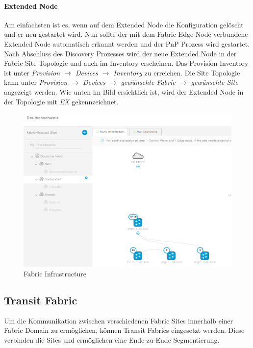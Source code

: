\paragraph{Extended Node}
Am einfachsten ist es, wenn auf dem Extended Node die Konfiguration gelöscht und er neu gestartet wird. Nun sollte der mit dem Fabric Edge Node verbundene Extended Node automatisch erkannt werden und der PnP Prozess wird gestartet. Nach Abschluss des Discovery Prozesses wird der neue Extended Node in der Fabric Site Topologie und auch im Inventory erscheinen. Das Provision Inventory ist unter \textit{Provision $\rightarrow$ Devices $\rightarrow$ Inventory} zu erreichen. Die Site Topologie kann unter \textit{Provision $\rightarrow$ Devices $\rightarrow$ gewünschte Fabric $\rightarrow$ gewünschte Site} angezeigt werden. Wie unten im Bild ersichtlich ist, wird der Extended Node in der Topologie mit \textit{EX} gekennzeichnet.

\begin{figure}[H]
	\centering
	\includegraphics[width=1\linewidth]{img/Absicherung/ExtendedNode4}
	\caption{Fabric Infrastructure}
	\label{fig:Fabric Infrastructure}
\end{figure}

\subsection{Transit Fabric}

Um die Kommunikation zwischen verschiedenen Fabric Sites innerhalb einer Fabric Domain zu ermöglichen, können Transit Fabrics eingesetzt werden. Diese verbinden die Sites und ermöglichen eine Ende-zu-Ende Segmentierung.

